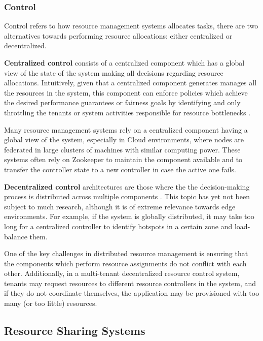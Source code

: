 \subsubsection{Control}

Control refers to how resource management systems allocates tasks, there are two alternatives towards performing resource allocations: either centralized or decentralized.

\textbf{Centralized control} consists of a centralized component which has a global view of the state of the system making all decisions regarding resource allocations. Intuitively, given that a centralized component generates manages all the resources in the system, this component can enforce policies which achieve the desired performance guarantees or fairness goals by identifying and only throttling the tenants or system activities responsible for resource bottlenecks \cite{verma2015large}.

Many resource management systems rely on a centralized component having a global view of the system, especially in Cloud environments, where nodes are federated in large clusters of machines with similar computing power. These systems often rely on Zookeeper \cite{hunt2010zookeeper} to maintain the component available and to transfer the controller state to a new controller in case the active one fails.

\textbf{Decentralized control} architectures are those where the the decision-making process is distributed across multiple components \cite{Hong2019}. This topic has yet not been subject to much research, although it is of extreme relevance towards edge environments. For example, if the system is globally distributed, it may take too long for a centralized controller to identify hotspots in a certain zone and load-balance them.

One of the key challenges in distributed resource management is ensuring that the components which perform resource assignments do not conflict with each other. Additionally, in a multi-tenant decentralized resource control system, tenants may request resources to different resource controllers in the system, and if they do not coordinate themselves, the application may be provisioned with too many (or too little) resources.

\subsection{Resource Sharing Systems}

